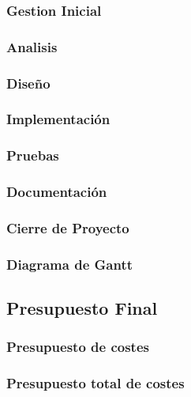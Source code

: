 \subsubsection{Gestion Inicial}

\subsubsection{Analisis}

\subsubsection{Diseño}

\subsubsection{Implementación}

\subsubsection{Pruebas}

\subsubsection{Documentación}

\subsubsection{Cierre de Proyecto}

\subsubsection{Diagrama de Gantt}

\subsection{Presupuesto Final}
\subsubsection{Presupuesto de costes}

\subsubsection{Presupuesto total de costes}

